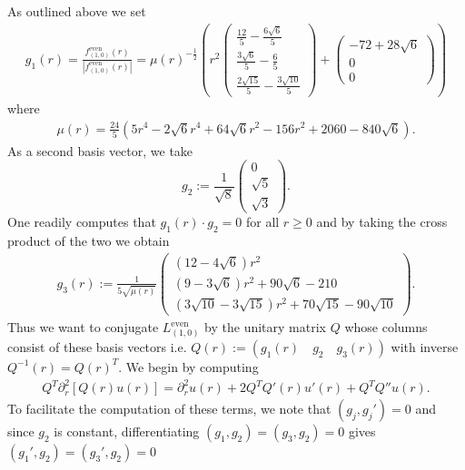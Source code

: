 \documentclass[11pt,reqno]{amsart}
\theoremstyle{remark}
\theoremstyle{definition}
\begin{document}
As outlined above we set 
\begin{align*}
  g_1(r)=\frac{ f_{(1,0)}^{\mathrm{even}}(r)}{| f_{(1,0)}^{\mathrm{even}}(r)|}=\mu(r)^{-\frac{1}{2}}\left(
                                r^2 \begin{pmatrix}\frac{12}{5} - \frac{6 \sqrt{6}}{5}\\
                                \frac{3 \sqrt{6}}{5} - \frac{6}{5}\\
                                \frac{2 \sqrt{15}}{5} - \frac{3 \sqrt{10}}{5}\end{pmatrix}
                                +   \begin{pmatrix}
                                        -72 + 28 \sqrt{6}  \\  0 \\  0
                                    \end{pmatrix}
                            \right)
\end{align*}
where \begin{align*}
    \mu(r)=\frac{24}{5} (5 r^4-2 \sqrt{6} r^4  + 64 \sqrt{6} r^2 -156 r^2 + 2060- 840 \sqrt{6} ).
\end{align*}
As a second basis vector, we take
\[
    g_2:=\frac{1}{\sqrt8}
    \begin{pmatrix}0\\ \sqrt5\\ \sqrt3\end{pmatrix}.
\]
One readily computes that $g_1(r)\cdot g_2=0 $ for all $r\geq 0$ and
 by taking the cross product of the two we obtain 
\begin{align*}
    g_3(r)
    :=\frac{1}{5\sqrt{\mu(r)}}
    \begin{pmatrix}
        (12-4\sqrt6)r^2 
        \\
        (9-3\sqrt6)r^2+90\sqrt6-210 
        \\
        (3\sqrt{10}-3\sqrt{15})r^2
        +70\sqrt{15}-90\sqrt{10}
    \end{pmatrix}.
\end{align*}
Thus we want to conjugate $L_{(1,0)}^{\mathrm{even}}$ by the unitary matrix $Q$ whose columns consist of these basis vectors i.e.
$   Q(r):= ( g_1(r)\quad g_2 \quad g_3(r))$
with inverse
$Q^{-1}(r)=Q(r)^T$.
We begin by computing
\begin{align*}
    Q^T\partial_r^2 [Q(r)u(r)]=\partial_r^2 u(r)+2Q^T Q'(r)u'(r)+Q^T Q'' u(r).
\end{align*}
To facilitate the computation of these terms, we note that $(g_j,g_j')=0$ and since \(g_2\) is constant, differentiating \((g_1,g_2)=(g_3,g_2)=0\) gives \((g_1',g_2)=(g_3',g_2)=0\)
\end{document}
